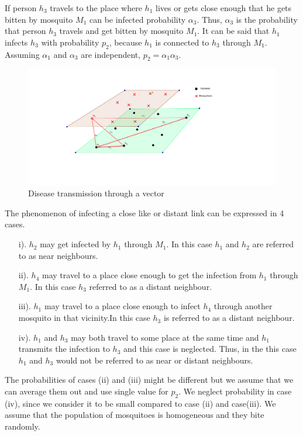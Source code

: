  If person $h_3$ travels to the place where $h_1$ lives or gets close enough that he gets bitten by mosquito $M_1$ can be infected probability $\alpha_3$. Thus, $\alpha_3$ is the probability that person $h_3$ travels and get bitten by mosquito $M_1$. It can be said that $h_1$ infects $h_3$ with probability $p_2$, because $h_1$ is connected to $h_3$ through $M_1$. Assuming $\alpha_1$ and $\alpha_3$ are independent, $p_2 = \alpha_1 \alpha_3$.
\begin{figure}[h!]
\centering
\includegraphics[scale=1]{images/human_mosquito.png}
\caption{Disease transmission through a vector} \label{fig5}
\end{figure}
The phenomenon of infecting a close like  or distant link can be expressed in 4 cases.


\begin{itemize}
\item[i).] $h_2$ may get infected by $h_1$ through $M_1$. In this case $h_1$ and $h_2$ are referred to as near neighbours.
\item[ii).] $h_4$ may travel to a place close enough to get the infection from $h_1$ through $M_1$. In this case $h_3$  referred to as a distant neighbour.
\item[iii).] $ h_1$ may travel to a place close enough to infect $h_4$  through another mosquito in that vicinity.In this case $h_3$ is  referred to as a distant neighbour.
\item[iv).] $h_1$  and $h_3$ may both travel to some place at the same time and $h_1$ transmits the infection to $h_3$ and this case is neglected. Thus, in the this case $h_1$ and $h_3$ would not be referred to as near or distant neighbours.
\end{itemize}

The probabilities of cases (ii) and (iii)
might be different but we assume that we can average them out and   use single value for $p_2$. We neglect probability in case (iv), since we consider it to be small compared to case (ii) and case(iii). We assume that the population of mosquitoes is homogeneous and they bite randomly.

